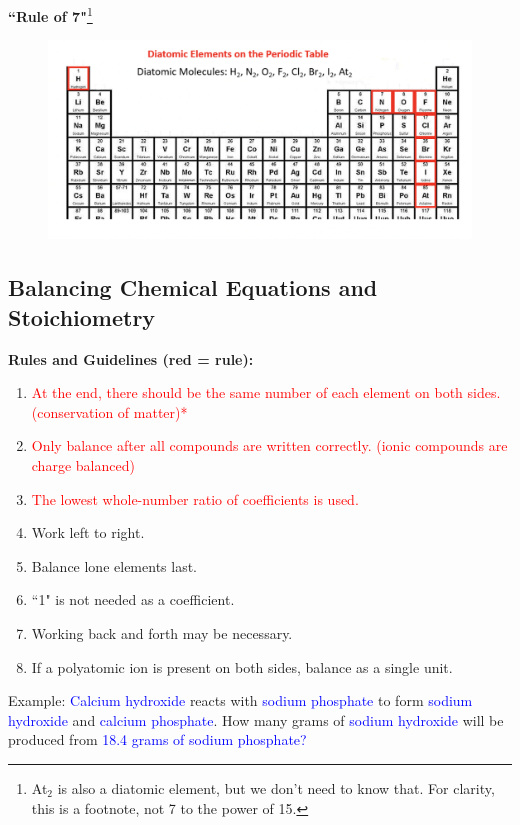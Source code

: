 \documentclass[a4paper, 12pt]{article}
\begin{document}
\textbf{``Rule of 7"}\footnote{At$_2$ is also a diatomic element, but we don't need to know that. For clarity, this is a footnote, not 7 to the power of 15.}

\begin{figure}[H]
    \centering
    \includegraphics[width=1\linewidth]{diatomics.png}
    \label{fig:y}
\end{figure}

\subsection{Balancing Chemical Equations and Stoichiometry}

\textbf{Rules and Guidelines (red = rule):}

\begin{enumerate}[leftmargin=*, nosep]
    \item \textcolor{red}{At the end, there should be the same number of each element on  both sides. (conservation of matter)*}
    \item \textcolor{red}{Only balance after all compounds are written correctly. (ionic compounds are charge balanced)}
    \item \textcolor{red}{The lowest whole-number ratio of coefficients is used.} 
    \item Work left to right.
    \item Balance lone elements last.
    \item ``1" is not needed as a coefficient.
    \item Working back and forth may be necessary.
    \item If a polyatomic ion is present on both sides, balance as a single unit.
\end{enumerate}
\vspace{1em}
Example: \textcolor{blue}{Calcium hydroxide} reacts with \textcolor{blue}{sodium phosphate} to form \textcolor{blue}{sodium hydroxide} and \textcolor{blue}{calcium phosphate}. How many grams of \textcolor{blue}{sodium hydroxide} will be produced from \textcolor{blue}{18.4 grams of sodium phosphate?}
\end{document}

